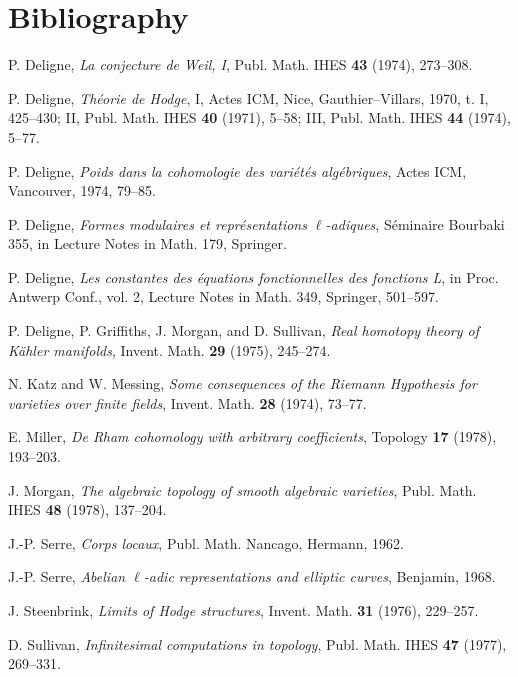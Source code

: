 \documentclass[11pt]{article}
\theoremstyle{remark}
\begin{document}
\section*{Bibliography}
\begin{enumerate}[label={[\arabic*]},leftmargin=3em]
\item P. Deligne, \emph{La conjecture de Weil, I}, Publ. Math. IHES \textbf{43} (1974), 273--308.
\item P. Deligne, \emph{Théorie de Hodge}, I, Actes ICM, Nice, Gauthier--Villars, 1970, t. I, 425--430; II, Publ. Math. IHES \textbf{40} (1971), 5--58; III, Publ. Math. IHES \textbf{44} (1974), 5--77.
\item P. Deligne, \emph{Poids dans la cohomologie des variétés algébriques}, Actes ICM, Vancouver, 1974, 79--85.
\item P. Deligne, \emph{Formes modulaires et représentations \(\ell\)-adiques}, Séminaire Bourbaki 355, in Lecture Notes in Math. 179, Springer.
\item P. Deligne, \emph{Les constantes des équations fonctionnelles des fonctions L}, in Proc. Antwerp Conf., vol. 2, Lecture Notes in Math. 349, Springer, 501--597.
\item P. Deligne, P. Griffiths, J. Morgan, and D. Sullivan, \emph{Real homotopy theory of Kähler manifolds}, Invent. Math. \textbf{29} (1975), 245--274.
\item N. Katz and W. Messing, \emph{Some consequences of the Riemann Hypothesis for varieties over finite fields}, Invent. Math. \textbf{28} (1974), 73--77.
\item E. Miller, \emph{De Rham cohomology with arbitrary coefficients}, Topology \textbf{17} (1978), 193--203.
\item J. Morgan, \emph{The algebraic topology of smooth algebraic varieties}, Publ. Math. IHES \textbf{48} (1978), 137--204.
\item J.-P. Serre, \emph{Corps locaux}, Publ. Math. Nancago, Hermann, 1962.
\item J.-P. Serre, \emph{Abelian \(\ell\)-adic representations and elliptic curves}, Benjamin, 1968.
\item J. Steenbrink, \emph{Limits of Hodge structures}, Invent. Math. \textbf{31} (1976), 229--257.
\item D. Sullivan, \emph{Infinitesimal computations in topology}, Publ. Math. IHES \textbf{47} (1977), 269--331.
\end{enumerate}
\end{document}
